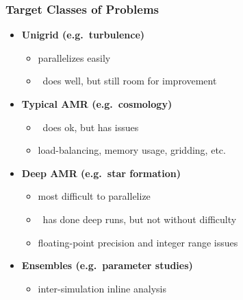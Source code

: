     \begin{frame}[fragile] \frametitle{Target Classes of Problems}

      \begin{itemize}
        \item {}\textbf{Unigrid (e.g.~turbulence)}
        \begin{itemize}
          \item  {} parallelizes easily
          \item  {}\enzo\ does well, but still room for improvement
        \end{itemize}
        \item {}\textbf{Typical AMR (e.g.~cosmology)}
        \begin{itemize}
	   \item {}\enzo\ does ok, but has issues
	   \item {}load-balancing, memory usage, gridding, etc.
        \end{itemize}
        \item {}\textbf{Deep AMR (e.g.~star formation)}
        \begin{itemize}
          \item {}most difficult to parallelize
          \item {}\enzo\ has done deep runs, but not without difficulty
          \item {}floating-point precision and integer range issues
        \end{itemize}
        \item {}\textbf{Ensembles (e.g.~parameter studies)}
        \begin{itemize}
           \item {}inter-simulation inline analysis
        \end{itemize}
 
      \end{itemize}
\end{frame}

